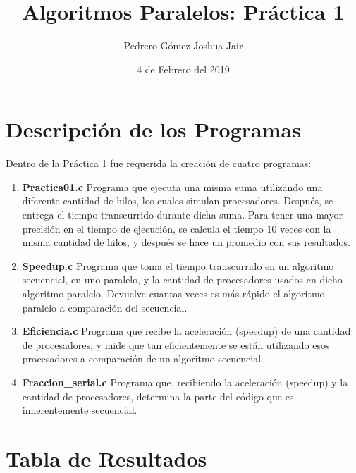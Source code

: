 \documentclass{article}
\title{Algoritmos Paralelos: Práctica 1}
\author{Pedrero Gómez Joshua Jair}
\date{4 de Febrero del 2019}
\begin{document}
\maketitle

\section{Descripción de los Programas}

Dentro de la Práctica 1 fue requerida la creación de cuatro programas:
\begin{enumerate}
	\item \textbf{Practica01.c} \linebreak 
	Programa que ejecuta una misma suma utilizando una diferente cantidad de hilos, los cuales simulan procesadores. Después, se entrega el tiempo transcurrido durante dicha suma. Para tener una mayor precisión en el tiempo de ejecución, se calcula el tiempo 10 veces con la misma cantidad de hilos, y después se hace un promedio con sus resultados.
	\item \textbf{Speedup.c} \linebreak
	Programa que toma el tiempo transcurrido en un algoritmo secuencial,
	en uno paralelo, y la cantidad de procesadores usados en dicho algoritmo paralelo. Devuelve cuantas veces es más rápido el algoritmo paralelo a comparación del secuencial.
	\item \textbf{Eficiencia.c} \linebreak
	Programa que recibe la aceleración (speedup) de una cantidad de procesadores, y mide que tan eficientemente se están utilizando esos procesadores a comparación de un algoritmo secuencial.
	\item \textbf{Fraccion\_serial.c} \linebreak
	Programa que, recibiendo la aceleración (speedup) y la cantidad de procesadores, determina la parte del código que es inherentemente secuencial.
	
\end{enumerate}

\pagebreak

\section{Tabla de Resultados}
\end{document}
